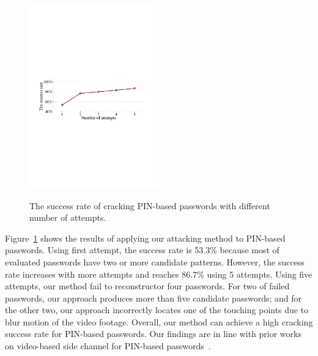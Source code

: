     \begin{figure}[!t]
        \centering
        \includegraphics[width=0.5\textwidth]{fig/pin_results}\\
        \caption{The success rate of cracking PIN-based passwords with different number of attempts.}
        \label{fig:pin_results}
    \end{figure}

        Figure~\ref{fig:pin_results} shows the
        results of applying our attacking method to PIN-based passwords.
        Using first attempt, the success rate is  53.3\% because most of
        evaluated passwords have two or more candidate patterns. However, the
        success rate increases with more attempts and reaches 86.7\% using 5
        attempts. Using five attempts, our method fail to reconstructor four
        passwords. For two of failed passwords, our approach produces more
        than five candidate passwords; and for the other two, our approach
        incorrectly locates one of the touching points due to  blur
        motion of the video footage. Overall, our method can achieve a high
        cracking success rate for PIN-based passwords. Our findings are in
        line with prior works on video-based side channel for PIN-based
        passwords~\cite{shukla2014beware}.

%


